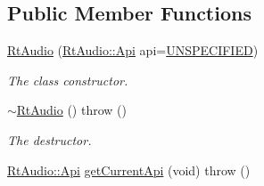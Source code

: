 \subsection*{Public Member Functions}
\begin{DoxyCompactItemize}
\item 
\hyperlink{class_rt_audio_afd0bfa26deae9804e18faff59d0273d9}{Rt\+Audio} (\hyperlink{class_rt_audio_ac9b6f625da88249d08a8409a9db0d849}{Rt\+Audio\+::\+Api} api=\hyperlink{class_rt_audio_ac9b6f625da88249d08a8409a9db0d849aa49af3ac767106158bc6cad74fb214ae}{U\+N\+S\+P\+E\+C\+I\+F\+I\+ED})
\begin{DoxyCompactList}\small\item\em The class constructor. \end{DoxyCompactList}\item 
\hyperlink{class_rt_audio_aa8a9716fd64680657ef69c9465442a2f}{$\sim$\+Rt\+Audio} ()  throw ()
\begin{DoxyCompactList}\small\item\em The destructor. \end{DoxyCompactList}\item 
\hyperlink{class_rt_audio_ac9b6f625da88249d08a8409a9db0d849}{Rt\+Audio\+::\+Api} \hyperlink{class_rt_audio_a83687634795792b2c47e4ae1cf8a5246}{get\+Current\+Api} (void)  throw ()\hypertarget{class_rt_audio_a83687634795792b2c47e4ae1cf8a5246}{}\label{class_rt_audio_a83687634795792b2c47e4ae1cf8a5246}


\end{DoxyCompactItemize}
